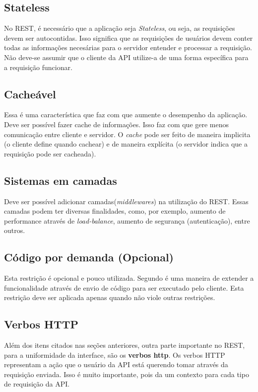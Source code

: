 \subsection{Stateless}

No REST, é necessário que a aplicação seja \textit{Stateless}, ou seja, as requisições
devem ser autocontidas. Isso significa que as requisições de usuários devem conter todas
as informações necesárias para o servidor entender e processar a requisição. Não deve-se
assumir que o cliente da API utilize-a de uma forma específica para a requisição funcionar.

\subsection{Cacheável}

Essa é uma característica que faz com que aumente o desempenho da aplicação. Deve ser
possível fazer cache de informações. Isso faz com que gere menos comunicação entre
cliente e servidor. O \textit{cache} pode ser feito de maneira implicita (o cliente
define quando cachear) e de maneira explícita (o servidor indica que a requisição pode
ser cacheada).

\subsection{Sistemas em camadas}

Deve ser possível adicionar camadas(\textit{middlewares}) na utilização do REST.
Essas camadas podem ter diversas finalidades, como, por exemplo, aumento de performance
através de \textit{load-balance}, aumento de segurança (autenticação), entre outros.

\subsection{Código por demanda (Opcional)}

Esta restrição é opcional e pouco utilizada. Segundo \cite{todd} é uma maneira de
extender a funcionalidade através de envio de código para ser executado pelo cliente.
Esta restrição deve ser aplicada apenas quando não viole outras restrições.

\subsection{Verbos HTTP}

Além dos itens citados nas seções anteriores, outra parte importante no REST,
para a uniformidade da interface, são os \textbf{verbos http}. Os verbos
HTTP representam a ação que o usuário da API está querendo tomar através da
requisição enviada. Isso é muito importante, pois da um contexto para cada
tipo de requisição da API.

